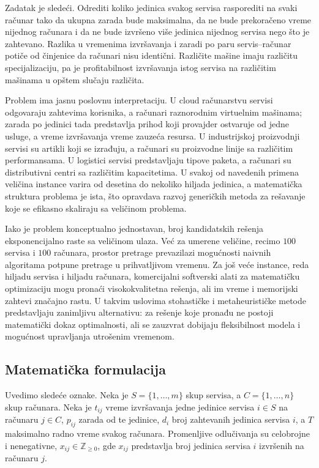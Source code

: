 \documentclass[12pt]{article}
\begin{document}
Zadatak je sledeći. Odrediti koliko jedinica svakog servisa rasporediti na svaki računar tako da ukupna zarada bude maksimalna, da ne bude prekoračeno vreme nijednog računara i da ne bude izvršeno više jedinica nijednog servisa nego što je zahtevano. Razlika u vremenima izvršavanja i zaradi po paru servis–računar potiče od činjenice da računari nisu identični. Različite mašine imaju različitu specijalizaciju, pa je profitabilnost izvršavanja istog servisa na različitim mašinama u opštem slučaju različita.

Problem ima jasnu poslovnu interpretaciju. U cloud računarstvu servisi odgovaraju zahtevima korisnika, a računari raznorodnim virtuelnim mašinama; zarada po jedinici tada predstavlja prihod koji provajder ostvaruje od jedne usluge, a vreme izvršavanja vreme zauzeća resursa. U industrijskoj proizvodnji servisi su artikli koji se izrađuju, a računari su proizvodne linije sa različitim performansama. U logistici servisi predstavljaju tipove paketa, a računari su distributivni centri sa različitim kapacitetima. U svakoj od navedenih primena veličina instance varira od desetina do nekoliko hiljada jedinica, a matematička struktura problema je ista, što opravdava razvoj generičkih metoda za rešavanje koje se efikasno skaliraju sa veličinom problema.

Iako je problem konceptualno jednostavan, broj kandidatskih rešenja eksponencijalno raste sa veličinom ulaza. Već za umerene veličine, recimo $100$ servisa i $100$ računara, prostor pretrage prevazilazi mogućnosti naivnih algoritama potpune pretrage u prihvatljivom vremenu. Za još veće instance, reda hiljadu servisa i hiljadu računara, komercijalni softverski alati za matematičku optimizaciju mogu pronaći visokokvalitetna rešenja, ali im vreme i memorijski zahtevi značajno rastu. U takvim uslovima stohastičke i metaheurističke metode predstavljaju zanimljivu alternativu: za rešenje koje pronađu ne postoji matematički dokaz optimalnosti, ali se zauzvrat dobijaju fleksibilnost modela i mogućnost upravljanja utrošenim vremenom.

\subsection{Matematička formulacija}

Uvedimo sledeće oznake. Neka je $S = \{1, \dots, m\}$ skup servisa, a $C = \{1, \dots, n\}$ skup računara. Neka je $t_{ij}$ vreme izvršavanja jedne jedinice servisa $i \in S$ na računaru $j \in C$, $p_{ij}$ zarada od te jedinice, $d_i$ broj zahtevanih jedinica servisa $i$, a $T$ maksimalno radno vreme svakog računara. Promenljive odlučivanja su celobrojne i nenegativne, $x_{ij} \in \mathbb{Z}_{\geq 0}$, gde $x_{ij}$ predstavlja broj jedinica servisa $i$ izvršenih na računaru $j$.
\end{document}
